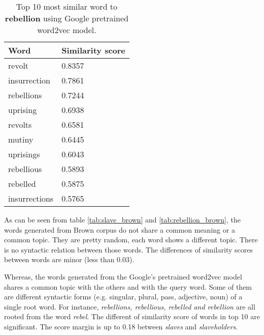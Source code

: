 \begin{table}[h!]
    \centering
    \begin{tabular}{|l|l|}
    \hline
    Word & Similarity score \\
        \hline
        revolt & 0.8357 \\
        insurrection & 0.7861 \\
        rebellions & 0.7244 \\
        uprising & 0.6938 \\
        revolts & 0.6581 \\
        mutiny & 0.6445 \\
        uprisings & 0.6043 \\
        rebellious & 0.5893 \\
        rebelled & 0.5875 \\
        insurrections & 0.5765 \\
        \hline
    \end{tabular}
    \caption{Top 10 most similar word to \textbf{rebellion} using Google pretrained word2vec model.}
    \label{tab:rebellion_google}
\end{table}


\hspace{1cm} As can be seen from table \ref{tab:slave_brown} and \ref{tab:rebellion_brown}, the words generated from Brown corpus do not share a common meaning or a common topic. They are pretty random, each word shows a different topic. There is no syntactic relation between those words. The differences of similarity scores between words are minor (less than 0.03).


\hspace{1cm} Whereas, the words generated from the Google's pretrained word2vec model shares a common topic with the others and with the query word. Some of them are different syntactic forms (e.g. singular, plural, pass, adjective, noun) of a single root word. For instance, \textit{rebellions, rebellious, rebelled and rebellion} are all rooted from the word \textit{rebel}. The different of similarity score of words in top 10 are significant. The score margin is up to 0.18 between \textit{slaves} and \textit{slaveholders}.

